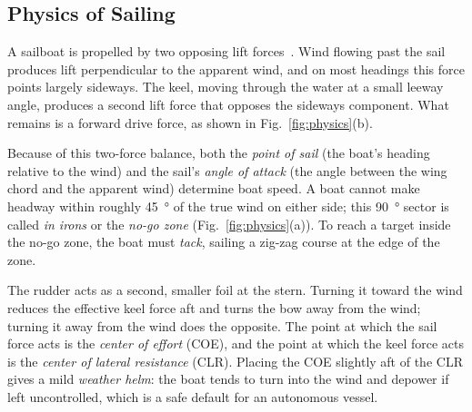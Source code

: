 \subsection{Physics of Sailing}
A sailboat is propelled by two opposing lift forces~\cite{skene2001}. Wind
flowing past the sail produces lift perpendicular to the apparent wind, and
on most headings this force points largely sideways. The keel, moving
through the water at a small leeway angle, produces a second lift force that
opposes the sideways component. What remains is a forward drive force, as
shown in Fig.~\ref{fig:physics}(b).

Because of this two-force balance, both the \emph{point of sail} (the boat's
heading relative to the wind) and the sail's \emph{angle of attack} (the angle
between the wing chord and the apparent wind) determine boat speed. A boat
cannot make headway within roughly \SI{45}{\degree} of the true wind on either
side; this \SI{90}{\degree} sector is called \emph{in irons} or the
\emph{no-go zone} (Fig.~\ref{fig:physics}(a)). To reach a target inside the
no-go zone, the boat must \emph{tack}, sailing a zig-zag course at the edge of
the zone.

The rudder acts as a second, smaller foil at the stern. Turning it toward
the wind reduces the effective keel force aft and turns the bow away from the
wind; turning it away from the wind does the opposite. The point at which the
sail force acts is the \emph{center of effort} (COE), and the point at which the
keel force acts is the \emph{center of lateral resistance} (CLR). Placing the
COE slightly aft of the CLR gives a mild \emph{weather helm}: the boat tends to
turn into the wind and depower if left uncontrolled, which is a safe default
for an autonomous vessel.

